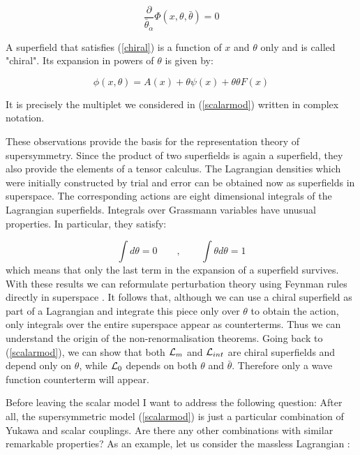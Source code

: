 \documentclass[a4paper,11pt]{article}
\begin{document}
\begin{equation}
\label{chiral}
\frac{\partial}{\bar{\theta}_{\dot{\alpha}}}\Phi (x, \theta ,\bar{\theta}) = 0
\end{equation}

A superfield that satisfies (\ref{chiral}) is a function of $x$ and
$\theta$ only and is called "chiral". Its expansion in powers
of $\theta$ is given by:

\begin{equation}
\label{chiral1}
\phi (x, \theta ) = A(x) + \theta \psi (x) + \theta \theta F(x)
\end{equation}

It is precisely the multiplet we considered in (\ref{scalarmod}) written in 
complex notation.

These
observations provide the basis for the representation theory of
supersymmetry. Since the product of two superfields is again a
superfield, they also provide the elements of a tensor calculus. The
Lagrangian densities which were initially constructed by trial and
error can be obtained now as superfields in superspace. The
corresponding actions are eight dimensional integrals of the Lagrangian
superfields. Integrals over Grassmann variables have unusual properties. In 
particular, they satisfy:

\begin{equation}
\label{Grasint}
\int d\theta = 0  \qquad , \qquad \int \theta  d\theta = 1
\end{equation}
\noindent
which means that only the last term in the expansion of a superfield survives. 
With these results we can reformulate perturbation theory using Feynman rules 
directly in superspace \cite{Gris..}. It follows that, although we can 
use a chiral superfield as part of a Lagrangian and integrate this piece only over 
$\theta$ to obtain the action, only integrals over the entire superspace appear as 
counterterms. Thus we can understand the origin of the non-renormalisation theorems. 
Going back to (\ref{scalarmod}), we can show that both ${\cal L}_m$ and 
${\cal L}_{int}$ are chiral superfields and depend only on $\theta$, while 
${\cal L}_0$ depends on both $\theta$ and $\bar{\theta}$. Therefore only a wave 
function counterterm will appear.

Before leaving the scalar model I want to address the following question: After all, 
the supersymmetric model (\ref{scalarmod}) is just a particular combination of Yukawa 
and scalar couplings. Are there any other combinations with similar remarkable 
properties? As an example, let us consider the massless Lagrangian \cite{INT}:
\end{document}
